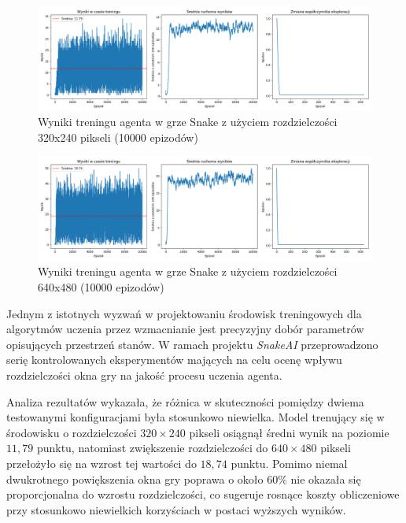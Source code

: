 \documentclass[a4paper,12pt]{article}
\begin{document}
\begin{figure}[H]
    \centering
    \includegraphics[width=1\linewidth]{rozdzialka320.png}
    \caption{Wyniki treningu agenta w grze Snake z użyciem rozdzielczości 320x240 pikseli (10000 epizodów)}
    \label{fig:wyniki_treningu_320}
\end{figure}

\begin{figure}[H]
    \centering
    \includegraphics[width=1\linewidth]{rozdzialka640.png}
    \caption{Wyniki treningu agenta w grze Snake z użyciem rozdzielczości 640x480 (10000 epizodów)}
    \label{fig:wyniki_treningu_640}
\end{figure}

Jednym z istotnych wyzwań w projektowaniu środowisk treningowych dla algorytmów uczenia przez wzmacnianie jest precyzyjny dobór parametrów opisujących przestrzeń stanów. W ramach projektu \emph{SnakeAI} przeprowadzono serię kontrolowanych eksperymentów mających na celu ocenę wpływu rozdzielczości okna gry na jakość procesu uczenia agenta.

Analiza rezultatów wykazała, że różnica w skuteczności pomiędzy dwiema testowanymi konfiguracjami była stosunkowo niewielka. Model trenujący się w środowisku o rozdzielczości $320\times240$ pikseli osiągnął średni wynik na poziomie $11{,}79$ punktu, natomiast zwiększenie rozdzielczości do $640\times480$ pikseli przełożyło się na wzrost tej wartości do $18{,}74$ punktu. Pomimo niemal dwukrotnego powiększenia okna gry poprawa o około $60\%$ nie okazała się proporcjonalna do wzrostu rozdzielczości, co sugeruje rosnące koszty obliczeniowe przy stosunkowo niewielkich korzyściach w postaci wyższych wyników.
\end{document}
